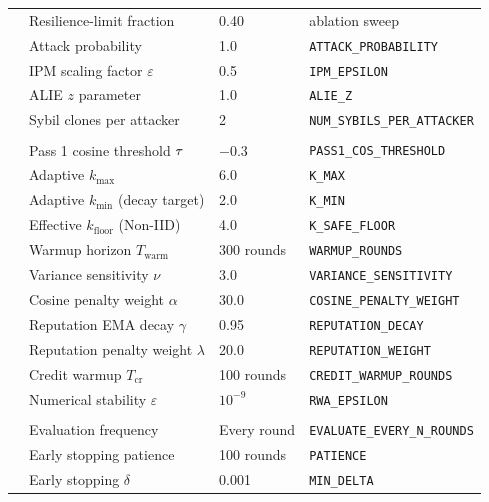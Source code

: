 \documentclass[../main.tex]{subfiles}
\begin{document}
\begin{table}[htbp]
{\begin{tabular}{llll}
& Resilience-limit fraction  & 0.40               & ablation sweep \\
& Attack probability         & 1.0                & \texttt{ATTACK\_PROBABILITY} \\
& IPM scaling factor $\varepsilon$ & 0.5         & \texttt{IPM\_EPSILON} \\
& ALIE $z$ parameter         & 1.0                & \texttt{ALIE\_Z} \\
& Sybil clones per attacker  & 2                  & \texttt{NUM\_SYBILS\_PER\_ATTACKER} \\
\addlinespace
\multicolumn{4}{l}{\textit{\aegis{} Aggregation Parameters}} \\
& Pass 1 cosine threshold $\tau$ & $-0.3$  & \texttt{PASS1\_COS\_THRESHOLD} \\
& Adaptive $k_{\max}$        & 6.0                & \texttt{K\_MAX} \\
& Adaptive $k_{\min}$ (decay target) & 2.0       & \texttt{K\_MIN} \\
& Effective $k_{\text{floor}}$ (Non-IID) & 4.0    & \texttt{K\_SAFE\_FLOOR} \\
& Warmup horizon $T_{\text{warm}}$ & 300 rounds  & \texttt{WARMUP\_ROUNDS} \\
& Variance sensitivity $\nu$ & 3.0               & \texttt{VARIANCE\_SENSITIVITY} \\
& Cosine penalty weight $\alpha$ & 30.0          & \texttt{COSINE\_PENALTY\_WEIGHT} \\
& Reputation EMA decay $\gamma$ & 0.95           & \texttt{REPUTATION\_DECAY} \\
& Reputation penalty weight $\lambda$ & 20.0     & \texttt{REPUTATION\_WEIGHT} \\
& Credit warmup $T_{\text{cr}}$ & 100 rounds     & \texttt{CREDIT\_WARMUP\_ROUNDS} \\
& Numerical stability $\varepsilon$ & $10^{-9}$  & \texttt{RWA\_EPSILON} \\
\addlinespace
\multicolumn{4}{l}{\textit{Evaluation}} \\
& Evaluation frequency       & Every round        & \texttt{EVALUATE\_EVERY\_N\_ROUNDS} \\
& Early stopping patience    & 100 rounds         & \texttt{PATIENCE} \\
& Early stopping $\delta$    & 0.001              & \texttt{MIN\_DELTA} \\
\bottomrule
\end{tabular}%
}
\end{table}
\end{document}
